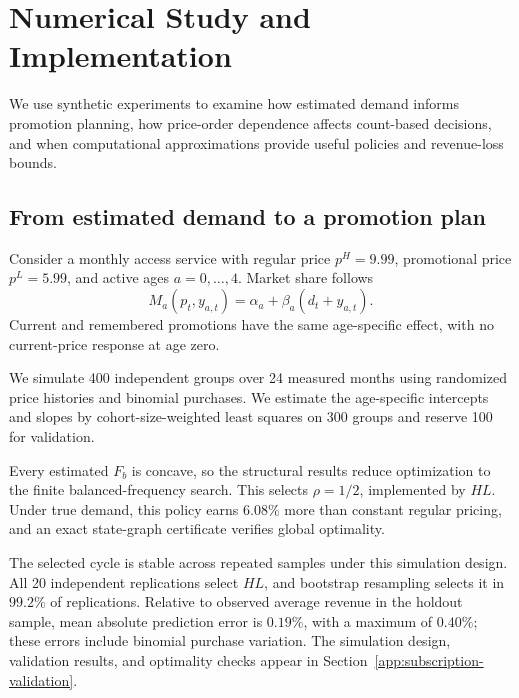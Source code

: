 
\begingroup\color{black}
\section{Numerical Study and Implementation}
\label{sec:usecase}

\begingroup\color{blue}
We use synthetic experiments to examine how estimated demand informs promotion planning, how price-order dependence affects count-based decisions, and when computational approximations provide useful policies and revenue-loss bounds.
\par\endgroup

\subsection{From estimated demand to a promotion plan}
\label{sec:estimated-cycle}
\label{sec:promotion-budget-numerics}

Consider a monthly access service with regular price \(p^H=9.99\), promotional price \(p^L=5.99\), and active ages \(a=0,\ldots,4\). Market share follows
\[
 M_a(p_t,y_{a,t})=\alpha_a+\beta_a(d_t+y_{a,t}).
\]
Current and remembered promotions have the same age-specific effect, with no current-price response at age zero.

We simulate 400 independent groups over 24 measured months using randomized price histories and binomial purchases. We estimate the age-specific intercepts and slopes by cohort-size-weighted least squares on 300 groups and reserve 100 for validation.

\begingroup\color{blue}
Every estimated \(F_b\) is concave, so the structural results reduce optimization to the finite balanced-frequency search. This selects \(\rho=1/2\), implemented by \(HL\). Under true demand, this policy earns \(6.08\%\) more than constant regular pricing, and an exact state-graph certificate verifies global optimality.
\par\endgroup

\begingroup\color{blue}
The selected cycle is stable across repeated samples under this simulation design. All 20 independent replications select \(HL\), and bootstrap resampling selects it in \(99.2\%\) of replications. Relative to observed average revenue in the holdout sample, mean absolute prediction error is \(0.19\%\), with a maximum of \(0.40\%\); these errors include binomial purchase variation. The simulation design, validation results, and optimality checks appear in Section~\ref{app:subscription-validation}.
\par\endgroup

